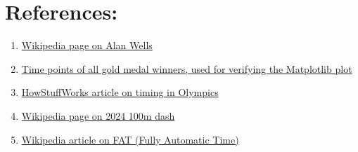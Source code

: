 \documentclass[11pt,a4paper]{article}
\begin{document}
\section*{References:} 
\begin{enumerate}
	\item  \href{https://en.wikipedia.org/wiki/Allan_Wells}{Wikipedia page on Alan Wells}
	\item \href{https://www.statista.com/statistics/1090316/olympics-100m-gold-medal-times-since-1896/}{Time points of all gold medal winners, used for verifying the Matplotlib plot}
	\item \href{https://entertainment.howstuffworks.com/olympic-timing.htm}{HowStuffWorks article on timing in Olympics}
	\item \href{https://en.wikipedia.org/wiki/Athletics_at_the_2024_Summer_Olympics_%E2%80%93_Men%27s_100_metres}{Wikipedia page on 2024 100m dash}
	\item \href{https://en.wikipedia.org/wiki/Fully_automatic_time}{Wikipedia article on FAT (Fully Automatic Time)}
\end{enumerate}
	
\end{document}
